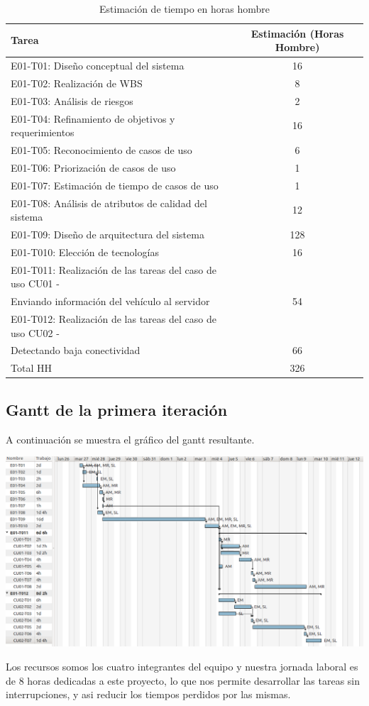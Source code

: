 \begin{table}[htb]
\begin{center}
\begin{tabular}{|l|c|}
\hline
Tarea & Estimación (Horas Hombre) \\
\hline \hline
E01-T01: Diseño conceptual del sistema & 16 \\ \hline
E01-T02: Realización de WBS & 8 \\ \hline
E01-T03: Análisis de riesgos & 2 \\ \hline
E01-T04: Refinamiento de objetivos y requerimientos & 16 \\ \hline
E01-T05: Reconocimiento de casos de uso & 6 \\ \hline
E01-T06: Priorización de casos de uso & 1 \\ \hline
E01-T07: Estimación de tiempo de casos de uso & 1 \\ \hline
E01-T08: Análisis de atributos de calidad del sistema & 12 \\ \hline
E01-T09: Diseño de arquitectura del sistema & 128 \\ \hline
E01-T010: Elección de tecnologías & 16 \\ \hline
E01-T011: Realización de las tareas del caso de uso CU01 - \\ Enviando información del vehículo al servidor & 54 \\ \hline
E01-T012: Realización de las tareas del caso de uso CU02 - \\ Detectando baja conectividad & 66 \\ \hline \hline
Total HH & 326 \\ \hline
\end{tabular}
\caption{Estimación de tiempo en horas hombre}
\end{center}
\end{table}


\subsection{Gantt de la primera iteración}

A continuación se muestra el gráfico del gantt resultante.
\newline

\centerline{\includegraphics[width=1\textwidth]{./imagenes/gantt.png}}

Los recursos somos los cuatro integrantes del equipo y nuestra jornada laboral
es de 8 horas dedicadas a este proyecto, lo que nos permite desarrollar las tareas
sin interrupciones, y asi reducir los tiempos perdidos por las mismas.

